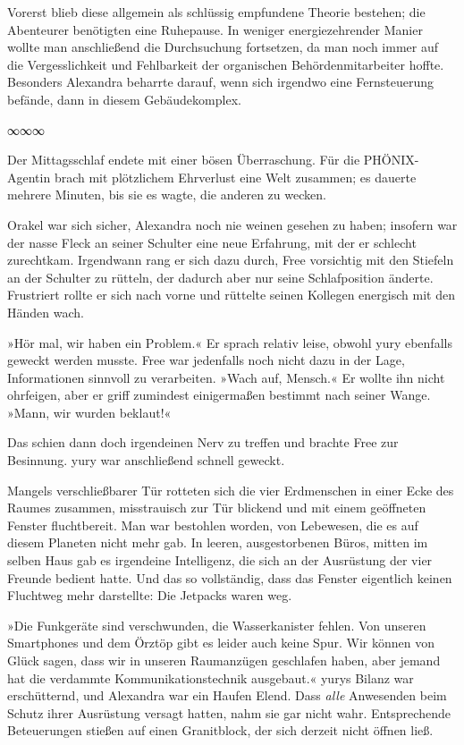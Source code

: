 Vorerst blieb diese allgemein als schlüssig empfundene Theorie bestehen; die Abenteurer benötigten eine Ruhepause. In weniger energiezehrender Manier wollte man anschließend die Durchsuchung fortsetzen, da man noch immer auf die Vergesslichkeit und Fehlbarkeit der organischen Behördenmitarbeiter hoffte. Besonders Alexandra beharrte darauf, wenn sich irgendwo eine Fernsteuerung befände, dann in diesem Gebäudekomplex.

\begin{center}
∞∞∞
\end{center}

Der Mittagsschlaf endete mit einer bösen Überraschung. Für die PHÖNIX-Agentin brach mit plötzlichem Ehrverlust eine Welt zusammen; es dauerte mehrere Minuten, bis sie es wagte, die anderen zu wecken.

Orakel war sich sicher, Alexandra noch nie weinen gesehen zu haben; insofern war der nasse Fleck an seiner Schulter eine neue Erfahrung, mit der er schlecht zurechtkam. Irgendwann rang er sich dazu durch, Free vorsichtig mit den Stiefeln an der Schulter zu rütteln, der dadurch aber nur seine Schlafposition änderte. Frustriert rollte er sich nach vorne und rüttelte seinen Kollegen energisch mit den Händen wach.

»Hör mal, wir haben ein Problem.« Er sprach relativ leise, obwohl yury ebenfalls geweckt werden musste. Free war jedenfalls noch nicht dazu in der Lage, Informationen sinnvoll zu verarbeiten. »Wach auf, Mensch.« Er wollte ihn nicht ohrfeigen, aber er griff zumindest einigermaßen bestimmt nach seiner Wange. »Mann, wir wurden beklaut!«

Das schien dann doch irgendeinen Nerv zu treffen und brachte Free zur Besinnung. yury war anschließend schnell geweckt.

Mangels verschließbarer Tür rotteten sich die vier Erdmenschen in einer Ecke des Raumes zusammen, misstrauisch zur Tür blickend und mit einem geöffneten Fenster fluchtbereit. Man war bestohlen worden, von Lebewesen, die es auf diesem Planeten nicht mehr gab. In leeren, ausgestorbenen Büros, mitten im selben Haus gab es irgendeine Intelligenz, die sich an der Ausrüstung der vier Freunde bedient hatte. Und das so vollständig, dass das Fenster eigentlich keinen Fluchtweg mehr darstellte: Die Jetpacks waren weg.

»Die Funkgeräte sind verschwunden, die Wasserkanister fehlen. Von unseren Smartphones und dem Örztöp gibt es leider auch keine Spur. Wir können von Glück sagen, dass wir in unseren Raumanzügen geschlafen haben, aber jemand hat die verdammte Kommunikationstechnik ausgebaut.« yurys Bilanz war erschütternd, und Alexandra war ein Haufen Elend. Dass \emph{alle} Anwesenden beim Schutz ihrer Ausrüstung versagt hatten, nahm sie gar nicht wahr. Entsprechende Beteuerungen stießen auf einen Granitblock, der sich derzeit nicht öffnen ließ.

